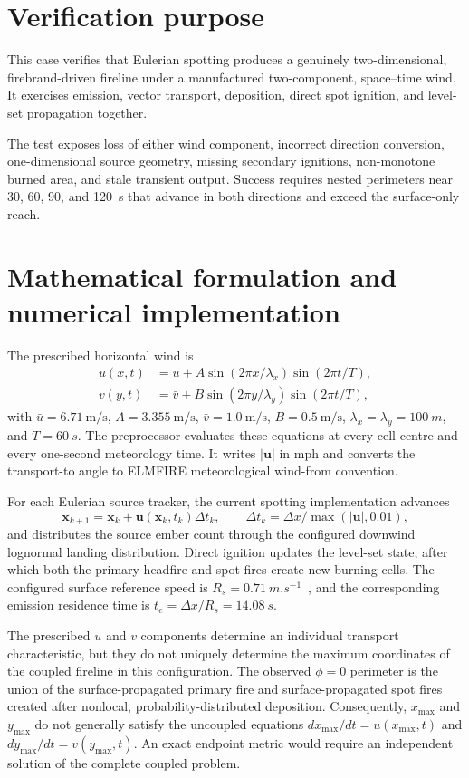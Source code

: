 \section{Verification purpose}

This case verifies that Eulerian spotting produces a genuinely two-dimensional, firebrand-driven fireline under a manufactured two-component, space--time wind. It exercises emission, vector transport, deposition, direct spot ignition, and level-set propagation together.

The test exposes loss of either wind component, incorrect direction conversion, one-dimensional source geometry, missing secondary ignitions, non-monotone burned area, and stale transient output. Success requires nested perimeters near 30, 60, 90, and 120~s that advance in both directions and exceed the surface-only reach.

\section{Mathematical formulation and numerical implementation}
The prescribed horizontal wind is
\begin{align}
u(x,t)&=\bar u+A\sin(2\pi x/\lambda_x)\sin(2\pi t/T),\\
v(y,t)&=\bar v+B\sin(2\pi y/\lambda_y)\sin(2\pi t/T),
\end{align}
with $\bar u=\SI{6.71}{\metre\per\second}$, $A=\SI{3.355}{\metre\per\second}$, $\bar v=\SI{1.0}{\metre\per\second}$, $B=\SI{0.5}{\metre\per\second}$, $\lambda_x=\lambda_y=\SI{100}{m}$, and $T=\SI{60}{s}$. The preprocessor evaluates these equations at every cell centre and every one-second meteorology time. It writes $|\mathbf u|$ in mph and converts the transport-to angle to ELMFIRE meteorological wind-from convention.

For each Eulerian source tracker, the current spotting implementation advances
\[
\mathbf x_{k+1}=\mathbf x_k+\mathbf u(\mathbf x_k,t_k)\Delta t_k,
\qquad \Delta t_k=\Delta x/\max(|\mathbf u|,0.01),
\]
and distributes the source ember count through the configured downwind lognormal landing distribution. Direct ignition updates the level-set state, after which both the primary headfire and spot fires create new burning cells. The configured surface reference speed is $R_s=\SI{0.71}{m.s^{-1}}$~\cite{Qin2025}, and the corresponding emission residence time is $t_e=\Delta x/R_s=\SI{14.08}{s}$.

The prescribed $u$ and $v$ components determine an individual transport
characteristic, but they do not uniquely determine the maximum coordinates of
the coupled fireline in this configuration. The observed $\phi=0$ perimeter is
the union of the surface-propagated primary fire and surface-propagated spot
fires created after nonlocal, probability-distributed deposition. Consequently,
$x_{\max}$ and $y_{\max}$ do not generally satisfy the uncoupled equations
$dx_{\max}/dt=u(x_{\max},t)$ and $dy_{\max}/dt=v(y_{\max},t)$. An exact endpoint
metric would require an independent solution of the complete coupled problem.

